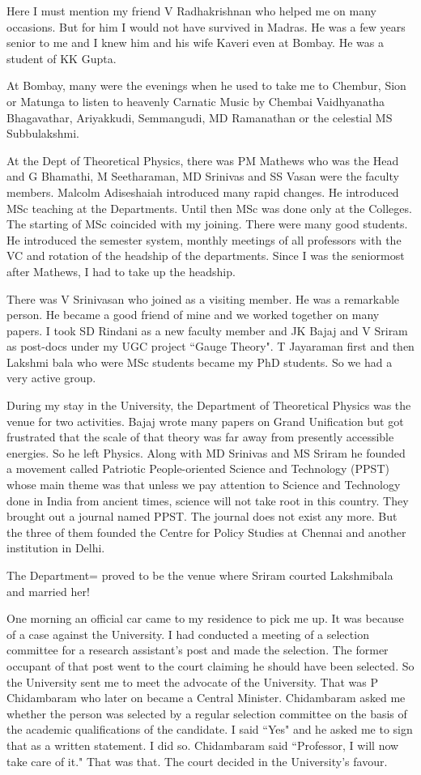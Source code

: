 Here I must mention my friend V Radhakrishnan who helped me on many 
occasions. But for him I would not have survived in Madras. He was a few 
years senior to me and I knew him and his wife Kaveri even at Bombay. He 
was a student of KK Gupta.

At Bombay, many were the evenings when he used to take me to Chembur, 
Sion or Matunga to listen to heavenly Carnatic Music by Chembai 
Vaidhyanatha Bhagavathar, Ariyakkudi, Semmangudi, MD Ramanathan or the 
celestial MS Subbulakshmi.

At the Dept of Theoretical Physics, there was PM Mathews who was the 
Head and G Bhamathi, M Seetharaman, MD Srinivas and SS Vasan were the 
faculty members. Malcolm Adiseshaiah introduced many rapid changes. He 
introduced MSc teaching at the Departments. Until then MSc was done only 
at the Colleges. The starting of MSc coincided with my joining. There 
were many good students. He introduced the semester system, monthly 
meetings of all professors with the VC and rotation of the headship of 
the departments. Since I was the seniormost after Mathews, I had to take 
up the headship.

There was V Srinivasan who joined as a visiting member. He was a 
remarkable person. He became a good friend of mine and we worked 
together on many papers. I took SD Rindani as a new faculty member and 
JK Bajaj and V Sriram as post-docs under my UGC project ``Gauge Theory". 
T Jayaraman first and then Lakshmi bala who were MSc students became my 
PhD students. So we had a very active group.

During my stay in the University, the Department of Theoretical Physics 
was the venue for two activities. Bajaj wrote many papers on Grand 
Unification but got frustrated that the scale of that theory was far 
away from presently accessible energies. So he left Physics. Along with 
MD Srinivas and MS Sriram he founded a movement called Patriotic 
People-oriented Science and Technology (PPST) whose main theme was that 
unless we pay attention to Science and Technology done in India from 
ancient times, science will not take root in this country. They brought 
out a journal named PPST. The journal does not exist any more. But the 
three of them founded the Centre for Policy Studies at Chennai and 
another institution in Delhi.

The Department= proved to be the venue where Sriram courted Lakshmibala 
and married her!
 
One morning an official car came to my residence to pick me up. It was 
because of a case against the University. I had conducted a meeting of a 
selection committee for a research assistant's post and made the 
selection. The former occupant of that post went to the court claiming 
he should have been selected. So the University sent me to meet the 
advocate of the University. That was P Chidambaram who later on became a 
Central Minister. Chidambaram asked me whether the person was selected 
by a regular selection committee on the basis of the academic 
qualifications of the candidate. I said ``Yes" and he asked me to sign 
that as a written statement. I did so. Chidambaram said ``Professor, I 
will now take care of it." That was that. The court decided in the 
University's favour.

